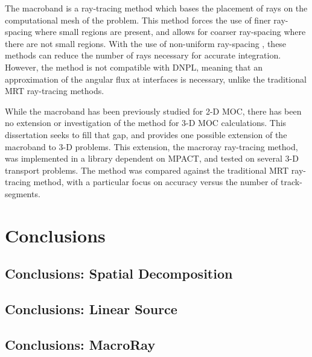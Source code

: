 {{{      The macroband \cite{Villarino1992,Petkov1999,Yamamoto2005,Fevotte2007} is a ray-tracing method which bases the placement of rays on the computational mesh of the problem.
      This method forces the use of finer ray-spacing where small regions are present, and allows for coarser ray-spacing where there are not small regions.
      With the use of non-uniform ray-spacing \cite{Yamamoto2005}, these methods can reduce the number of rays necessary for accurate integration.
      However, the method is not compatible with \acf{DNPL}, meaning that an approximation of the angular flux at interfaces is necessary, unlike the traditional \acf{MRT} ray-tracing methods.

      While the macroband has been previously studied for 2-D \ac{MOC}, there has been no extension or investigation of the method for 3-D \ac{MOC} calculations.
      This dissertation seeks to fill that gap, and provides one possible extension of the macroband to 3-D problems.
      This extension, the macroray ray-tracing method, was implemented in a library dependent on MPACT, and tested on several 3-D transport problems.
      The method was compared against the traditional \ac{MRT} ray-tracing method, with a particular focus on accuracy versus the number of track-segments.
    }
  }

  \section{Conclusions}{\label{sec:Conclusions}

    \subsection{Conclusions: Spatial Decomposition}{\label{ssec:Conclusions:Spatial Decomposition}
    }

    \subsection{Conclusions: Linear Source}{\label{ssec:Conclusions:Linear Source}
    }

    \subsection{Conclusions: MacroRay}{\label{ssec:Conclusions:MacroRay}
    }


}}
